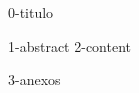 \documentclass[12pt,a4paper,oneside]{book}
\begin{document}
\renewcommand{\arraystretch}{1.2}



{0-titulo}

{1-abstract}
{2-content}




{3-anexos}
\end{document}

